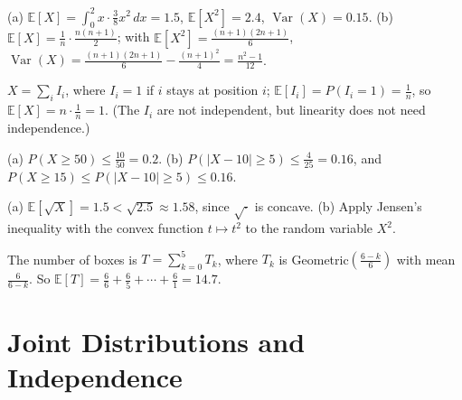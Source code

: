 \documentclass[11pt]{article}
\newcommand{\E}{\mathbb{E}}
\DeclareMathOperator{\Var}{Var}
\begin{document}
\begin{description}[leftmargin=0pt, itemsep=0.3em]
    \item[\ref{pr:density-moments}.] (a) $\E[X] = \int_0^2 x \cdot \frac{3}{8}x^2\, dx = 1.5$, $\E[X^2] = 2.4$, $\Var(X) = 0.15$. (b) $\E[X] = \frac{1}{n}\cdot\frac{n(n + 1)}{2}$; with $\E[X^2] = \frac{(n + 1)(2n + 1)}{6}$, $\Var(X) = \frac{(n + 1)(2n + 1)}{6} - \frac{(n + 1)^2}{4} = \frac{n^2 - 1}{12}$.
    \item[\ref{pr:fixed-points}.] $X = \sum_i I_i$, where $I_i = 1$ if $i$ stays at position $i$; $\E[I_i] = P(I_i = 1) = \frac{1}{n}$, so $\E[X] = n \cdot \frac{1}{n} = 1$. (The $I_i$ are not independent, but linearity does not need independence.)
    \item[\ref{pr:markov-chebyshev}.] (a) $P(X \geq 50) \leq \frac{10}{50} = 0.2$. (b) $P(|X - 10| \geq 5) \leq \frac{4}{25} = 0.16$, and $P(X \geq 15) \leq P(|X - 10| \geq 5) \leq 0.16$.
    \item[\ref{pr:jensen}.] (a) $\E[\sqrt{X}] = 1.5 < \sqrt{2.5} \approx 1.58$, since $\sqrt{\cdot}$ is concave. (b) Apply Jensen's inequality with the convex function $t \mapsto t^2$ to the random variable $X^2$.
    \item[\ref{pr:coupons}.] The number of boxes is $T = \sum_{k=0}^5 T_k$, where $T_k$ is Geometric$(\frac{6 - k}{6})$ with mean $\frac{6}{6 - k}$. So $\E[T] = \frac{6}{6} + \frac{6}{5} + \cdots + \frac{6}{1} = 14.7$.
\end{description}

\section*{Joint Distributions and Independence}
\end{document}
